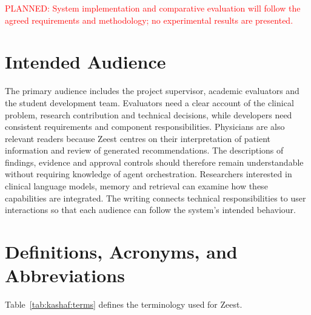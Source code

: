 \textcolor{red}{PLANNED: System implementation and comparative evaluation will follow the agreed requirements and methodology; no experimental results are presented.}

\section{Intended Audience}

The primary audience includes the project supervisor, academic evaluators and the student development team. Evaluators need a clear account of the clinical problem, research contribution and technical decisions, while developers need consistent requirements and component responsibilities. Physicians are also relevant readers because Zeest centres on their interpretation of patient information and review of generated recommendations. The descriptions of findings, evidence and approval controls should therefore remain understandable without requiring knowledge of agent orchestration. Researchers interested in clinical language models, memory and retrieval can examine how these capabilities are integrated. The writing connects technical responsibilities to user interactions so that each audience can follow the system's intended behaviour.

\section{Definitions, Acronyms, and Abbreviations}

Table~\ref{tab:kashaf:terms} defines the terminology used for Zeest.

